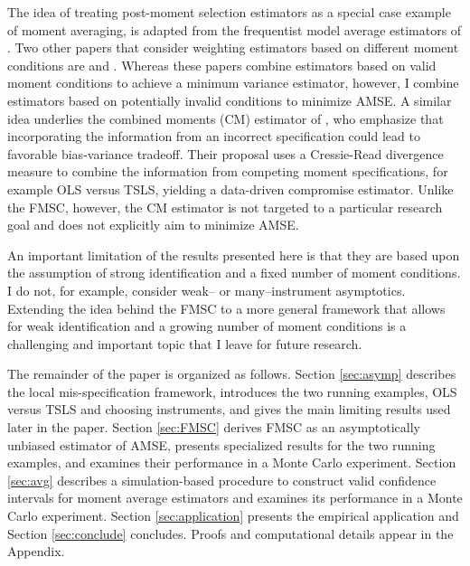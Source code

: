 The idea of treating post-moment selection estimators as a special case example of moment averaging, is adapted from the frequentist model average estimators of \cite{HjortClaeskens}.
Two other papers that consider weighting estimators based on different moment conditions are \cite{Xiao} and \cite{ChenChavezLinton}.
Whereas these papers combine estimators based on valid moment conditions to achieve a minimum variance estimator, however, I combine estimators based on potentially invalid conditions to minimize AMSE. 
A similar idea underlies the combined moments (CM) estimator of \cite{Judge2007}, who emphasize that incorporating the information from an incorrect specification could lead to favorable bias-variance tradeoff. 
Their proposal uses a Cressie-Read divergence measure to combine the information from competing moment specifications, for example OLS versus TSLS, yielding a data-driven compromise estimator. Unlike the FMSC, however, the CM estimator is not targeted to a particular research goal and does not explicitly aim to minimize AMSE.

An important limitation of the results presented here is that they are based upon the assumption of strong identification and a fixed number of moment conditions.
I do not, for example, consider weak-- or many--instrument asymptotics.
Extending the idea behind the FMSC to a more general framework that allows for weak identification and a growing number of moment conditions is a challenging and important topic that I leave for future research.

The remainder of the paper is organized as follows.
Section \ref{sec:asymp} describes the local mis-specification framework, introduces the two running examples, OLS versus TSLS and choosing instruments, and gives the main limiting results used later in the paper. 
Section \ref{sec:FMSC} derives FMSC as an asymptotically unbiased estimator of AMSE, presents specialized results for the two running examples, and examines their performance in a Monte Carlo experiment. 
Section \ref{sec:avg} describes a simulation-based procedure to construct valid confidence intervals for moment average estimators and examines its performance in a Monte Carlo experiment. Section \ref{sec:application} presents the empirical application and Section \ref{sec:conclude} concludes.
Proofs and computational details appear in the Appendix.